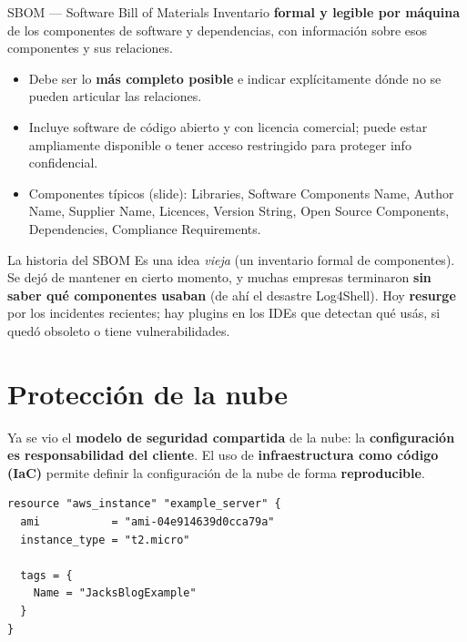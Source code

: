\documentclass[11pt,a4paper]{article}
\begin{document}
\begin{defbox}{SBOM — Software Bill of Materials}
Inventario \textbf{formal y legible por máquina} de los componentes de software y dependencias,
con información sobre esos componentes y sus relaciones.
\begin{itemize}[leftmargin=1.4em,itemsep=1pt]
  \item Debe ser lo \textbf{más completo posible} e indicar explícitamente dónde no se pueden
        articular las relaciones.
  \item Incluye software de código abierto y con licencia comercial; puede estar ampliamente
        disponible o tener acceso restringido para proteger info confidencial.
  \item Componentes típicos (slide): Libraries, Software Components Name, Author Name, Supplier
        Name, Licences, Version String, Open Source Components, Dependencies, Compliance
        Requirements.
\end{itemize}
\end{defbox}

\begin{anecbox}{La historia del SBOM}
Es una idea \emph{vieja} (un inventario formal de componentes). Se dejó de mantener en cierto
momento, y muchas empresas terminaron \textbf{sin saber qué componentes usaban} (de ahí el
desastre Log4Shell). Hoy \textbf{resurge} por los incidentes recientes; hay plugins en los IDEs
que detectan qué usás, si quedó obsoleto o tiene vulnerabilidades.
\end{anecbox}

\section{Protección de la nube}

Ya se vio el \textbf{modelo de seguridad compartida} de la nube: la \textbf{configuración es
responsabilidad del cliente}. El uso de \textbf{infraestructura como código (IaC)} permite
definir la configuración de la nube de forma \textbf{reproducible}.

\begin{lstlisting}[style=hcl,caption={Ejemplo de IaC con Terraform (de la slide)},captionpos=b]
resource "aws_instance" "example_server" {
  ami           = "ami-04e914639d0cca79a"
  instance_type = "t2.micro"

  tags = {
    Name = "JacksBlogExample"
  }
}
\end{lstlisting}
\end{document}
